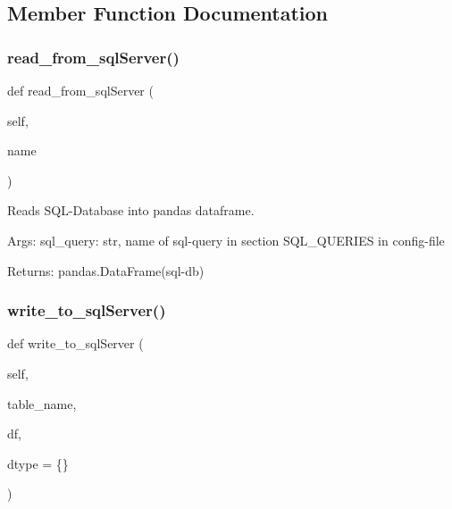 \subsection{Member Function Documentation}
\mbox{\label{class_data___i_o_1_1_data___i_o_a6af825f0682e54cbb22f57a189a6fcc8}} 
\subsubsection{\texorpdfstring{read\+\_\+from\+\_\+sql\+Server()}{read\_from\_sqlServer()}}
{\footnotesize\ttfamily def read\+\_\+from\+\_\+sql\+Server (\begin{DoxyParamCaption}\item[{}]{self,  }\item[{}]{name }\end{DoxyParamCaption})}

\begin{DoxyVerb}Reads SQL-Database into pandas dataframe.

Args:
    sql_query: str, name of sql-query in section SQL_QUERIES
        in config-file

Returns:
    pandas.DataFrame(sql-db)
\end{DoxyVerb}
 \mbox{\label{class_data___i_o_1_1_data___i_o_adf0ca5cf816de8cfc624b287103b4f03}} 
\subsubsection{\texorpdfstring{write\+\_\+to\+\_\+sql\+Server()}{write\_to\_sqlServer()}}
{\footnotesize\ttfamily def write\+\_\+to\+\_\+sql\+Server (\begin{DoxyParamCaption}\item[{}]{self,  }\item[{}]{table\+\_\+name,  }\item[{}]{df,  }\item[{}]{dtype = {\ttfamily \{\}} }\end{DoxyParamCaption})}


